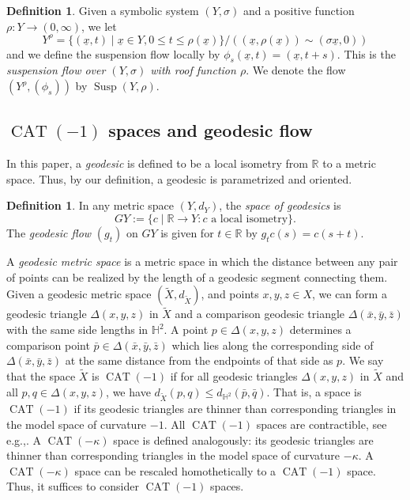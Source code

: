 \documentclass[11pt]{article}
\newcommand{\eg}{e.g.,\xspace}
\let\sep\mid
\theoremstyle{definition}
\newtheorem{defn}[thm]{Definition}
\numberwithin{equation}{section}
\DeclareMathOperator{\CAT}{CAT}
\DeclareMathOperator{\Susp}{Susp}
\begin{document}
\begin{defn}
Given a symbolic system $(Y, \sigma)$ and a positive function $\rho: Y \to (0,\infty)$, we let
\[
Y^{\rho} = \{ (\underline x,t)\sep \underline x\in Y, 0\leq t \leq \rho(\underline x) \}\big/((\underline x, \rho(\underline x))\sim(\sigma \underline x,0))\]
and we define the suspension flow locally by $\phi_s(\underline x, t) = (\underline x, t+s).$ This is the \emph{suspension flow over $(Y, \sigma)$ with roof function $\rho$}. We denote the flow $(Y^{\rho}, (\phi_s))$ by $\Susp(Y, \rho)$.
\end{defn}

\subsection{$\CAT(-1)$ spaces and geodesic flow}\label{subsec:CAT (-1)}

In this paper, a \emph{geodesic} is defined to be a local isometry from $\mathbb{R}$ to a metric space. Thus, by our definition, a geodesic is parametrized and oriented.

\begin{defn}
In any metric space $(Y,d_Y)$, the \emph{space of geodesics} is
\[ GY:= \{ c\sep\mathbb{R} \rightarrow Y : c \text{ a local isometry}\}.\]
The \emph{geodesic flow} $(g_t)$ on $GY$ is given for $t \in \mathbb R$ by $g_tc(s) = c(s+t)$.
\end{defn}

A \emph{geodesic metric space} is a metric space in which the distance between any pair of points can be realized by the length of a geodesic segment connecting them. Given a geodesic metric space $(\tilde X,d_{\tilde X})$, and points $x,y,z \in X$, we can form a geodesic triangle $\Delta(x,y,z)$ in $\tilde X$ and a comparison geodesic triangle $\Delta(\bar x, \bar y, \bar z)$ with the same side lengths in $\mathbb{H}^2$. A point $p \in \Delta(x,y,z)$ determines a comparison point $\bar p \in \Delta(\bar x, \bar y, \bar z)$ which lies along the corresponding side of $\Delta(\bar x, \bar y, \bar z)$ at the same distance from the endpoints of that side as $p$. We say that the space $\tilde X$ is $\CAT(-1)$ if for all geodesic triangles $\Delta(x,y,z)$ in $\tilde X$ and all $p,q \in \Delta(x,y,z)$, we have $d_{\tilde X}(p,q)\leq d_{\mathbb{H}^2}(\bar p, \bar q)$. That is, a space is $\CAT(-1)$ if its geodesic triangles are thinner than corresponding triangles in the model space of curvature $-1$. All $\CAT(-1)$ spaces are contractible, see \eg \cite[Chap.\,3, Props\,28 \&\,29]{troyanov}. A $\CAT(-\kappa)$ space is defined analogously: its geodesic triangles are thinner than corresponding triangles in the model space of curvature $-\kappa$. A $\CAT(- \kappa)$ space can be rescaled homothetically to a $\CAT(-1)$ space. Thus, it suffices to consider $\CAT(-1)$ spaces.
\end{document}
